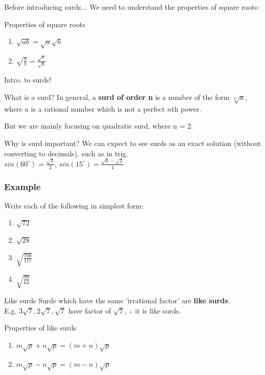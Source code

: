 \documentclass[
	11pt, %
]{beamer}
\begin{document}
\begin{frame}{Before introducing surds...}
    We need to understand the properties of square roots:\\
    \begin{block}{Properties of square roots}
        \begin{enumerate}
            \item $\sqrt{ab} = \sqrt{a}\sqrt{b}$
            \item $\sqrt{\frac{a}{b}} = \frac{\sqrt{a}}{\sqrt{b}}$
        \end{enumerate}
    \end{block}
\end{frame}

\begin{frame}{Intro. to surds!}
    \begin{block}{What is a surd?}
        In general, a \textbf{surd of order n} is a number of the form $\sqrt[n]{a}$, where $a$ is a rational number which is \alert{not} a perfect
        $n$th power.
    \end{block}
    But we are mainly focusing on quadratic surd, where n = 2.\\
    \bigskip
    \begin{block}{Why is surd important?}
        We can expect to see surds as an exact solution (without converting to decimals), such as in trig.\\
        $sin(60^\circ) = \frac{\sqrt{3}}{2}$, \quad $sin(15^\circ) = \frac{\sqrt{6} - \sqrt{2}}{4}$
    \end{block}
\end{frame}

\begin{frame}[t]
    \frametitle{Example}
    Write each of the following in simplest form:\\
    \begin{enumerate}
        \item $\sqrt{72}$
        \item $\sqrt{28}$
        \item $\sqrt{\frac{700}{117}}$
        \item $\sqrt{\frac{99}{64}}$
    \end{enumerate}
\end{frame}

\begin{frame}{Like surds}
    Surds which have the same 'irrational factor' are \textbf{like surds}.\\
    E.g. $3\sqrt{7}, 2\sqrt{7}, \sqrt{7}$ have factor of $\sqrt{7}$, $\therefore$ it is like surds.\\
    \begin{block}{Properties of like surds}
        \begin{enumerate}
            \item $m\sqrt{p} + n\sqrt{p} = (m+n)\sqrt{p}$
            \item $m\sqrt{p} - n\sqrt{p} = (m-n)\sqrt{p}$
        \end{enumerate}
    \end{block}
\end{frame}
\end{document}
